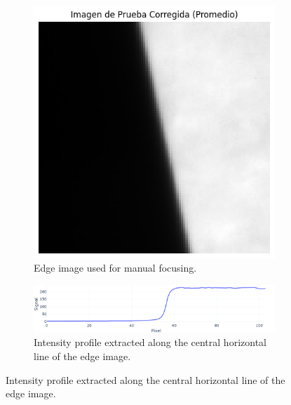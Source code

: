 \begin{figure}[H]
    \centering
    \begin{subfigure}[b]{0.7\linewidth}
        \centering
        \includegraphics[trim=0mm 0mm 0mm 10mm, clip, width=\linewidth]{Figures/C3/SE_1.png}
        \caption{Edge image used for manual focusing.}
        \label{fig:enfoque}
    \end{subfigure}
    
    \vspace{1em} %

    \begin{subfigure}[b]{0.95\linewidth}
        \centering
        \includegraphics[width=\linewidth]{Figures/C3/SE_signal.png}
        \caption{Intensity profile extracted along the central horizontal line of the edge image.}
        \label{fig:se_signal}
    \end{subfigure}
    

\end{figure}
